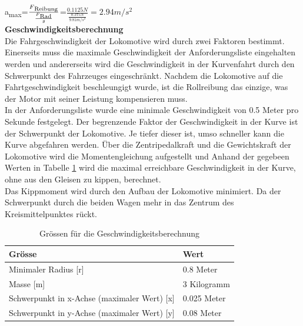 \documentclass[../../main.tex]{subfiles}
\begin{document}
    a\textsubscript{max}=\(\frac{F\textsubscript{Reibung}}{\frac{F\textsubscript{Rad}}{g}}\)=\(\frac{0.1125N}{\frac{0.375N}{9.81m/s^2}}=2.94m/s^2\)\\

    \textbf{Geschwindigkeitsberechnung}\\
    Die Fahrgeschwindigkeit der Lokomotive wird durch zwei Faktoren bestimmt. Einerseits muss die maximale Geschwindigkeit der Anforderungsliste eingehalten werden und andererseits wird die Geschwindigkeit in der Kurvenfahrt durch den Schwerpunkt des Fahrzeuges eingeschränkt. Nachdem die Lokomotive auf die Fahrtgeschwindigkeit beschleungigt wurde, ist die Rollreibung das einzige, was der Motor mit seiner Leistung kompensieren muss.\\

    In der Anforderungsliste wurde eine minimale Geschwindigkeit von 0.5 Meter pro Sekunde festgelegt. Der begrenzende Faktor der Geschwindigkeit in der Kurve ist der Schwerpunkt der Lokomotive. Je tiefer dieser ist, umso schneller kann die Kurve abgefahren werden. Über die Zentripedalkraft und die Gewichtskraft der Lokomotive wird die Momentengleichung aufgestellt und Anhand der gegebeen Werten in Tabelle \ref{tab:geschwindigkeitsberechnung} wird die maximal erreichbare Geschwindigkeit in der Kurve, ohne aus den Gleisen zu kippen, berechnet.\\
       
    Das Kippmoment wird durch den Aufbau der Lokomotive minimiert. Da der Schwerpunkt durch die beiden Wagen mehr in das Zentrum des Kreismittelpunktes rückt.\\

    \begin{table}[H] \centering
        \begin{tabular}{|l|l|}
        \hline
        \textbf{Grösse} & \textbf{Wert}\\
        \hline
        Minimaler Radius  [r]                               & 0.8 Meter\\
         \hline
        Masse [m]                                           & 3 Kilogramm\\
        \hline
        Schwerpunkt in x-Achse (maximaler Wert) [x]         & 0.025 Meter\\
        \hline
        Schwerpunkt in y-Achse (maximaler Wert) [y]         & 0.08 Meter\\
        \hline
        \end{tabular}
        
        \caption{Grössen für die Geschwindigkeitsberechnung}
        \label{tab:geschwindigkeitsberechnung}
        \end{table}
\end{document}
